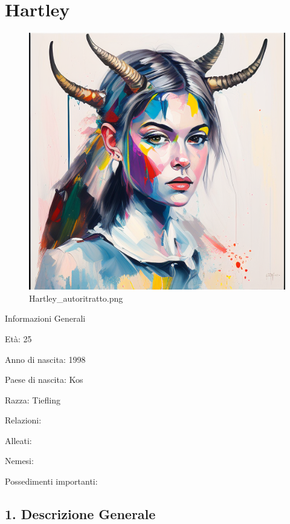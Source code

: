 \section{Hartley}\label{hartley}


\begin{figure}
\centering
\includegraphics{Hartley_autoritratto.png}
\caption{Hartley\_autoritratto.png}
\end{figure}

Informazioni Generali

Età: 25

Anno di nascita: 1998

Paese di nascita: Kos

Razza: Tiefling

Relazioni:

Alleati:

Nemesi:

Possedimenti importanti:


\subsection{1. Descrizione Generale}\label{descrizione-generale}


